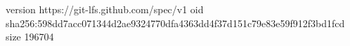 version https://git-lfs.github.com/spec/v1
oid sha256:598dd7acc071344d2ae9324770dfa4363dd4f37d151c79e83e59f912f3bd1fcd
size 196704
